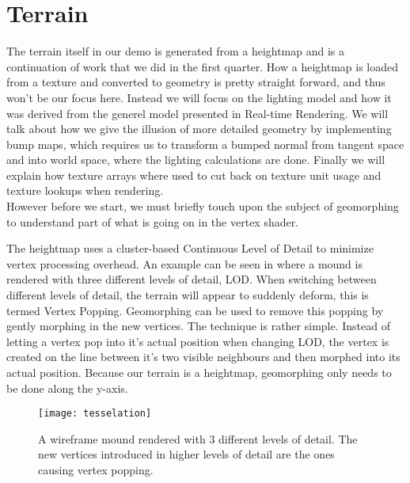 \chapter{Terrain}


The terrain itself in our demo is generated from a heightmap and is a
continuation of work that we did in the first quarter. How a heightmap
is loaded from a texture and converted to geometry is pretty straight
forward, and thus won't be our focus here. Instead we will focus on
the lighting model and how it was derived from the generel model
presented in Real-time Rendering. We will talk about how we give the
illusion of more detailed geometry by implementing bump maps, which
requires us to transform a bumped normal from tangent space and into
world space, where the lighting calculations are done. Finally we will
explain how texture arrays where used to cut back on texture unit
usage and texture lookups when rendering.\\


However before we start, we must briefly touch upon the subject of
geomorphing to understand part of what is going on in the vertex
shader.


The heightmap uses a cluster-based Continuous Level of Detail to
minimize vertex processing overhead. An example can be seen in
 where a mound is rendered with three
different levels of detail, LOD. When switching between different
levels of detail, the terrain will appear to suddenly deform, this is
termed Vertex Popping. Geomorphing can be used to remove this popping
by gently morphing in the new vertices. The technique is rather
simple. Instead of letting a vertex pop into it's actual position when
changing LOD, the vertex is created on the line between it's two
visible neighbours and then morphed into its actual position. Because
our terrain is a heightmap, geomorphing only needs to be done along
the y-axis.

\begin{figure}
  \label{fig:tesselation}
  \centering
  \texttt{[image: tesselation]}
  \caption{A wireframe mound rendered with 3 different levels of
    detail. The new vertices introduced in higher levels of detail are
    the ones causing vertex popping.}
\end{figure}

